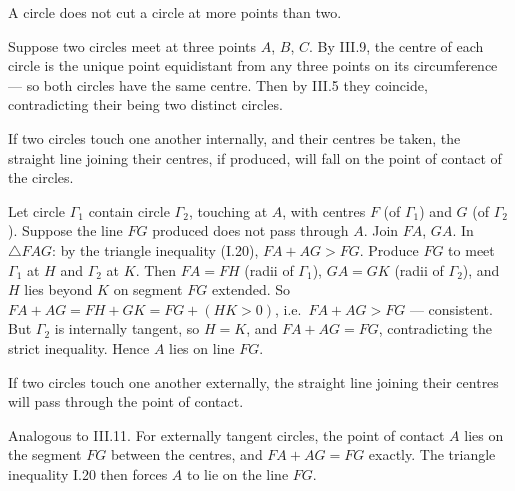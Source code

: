 \documentclass{rrxiv}
\begin{document}
\begin{claim}
\label{prop:III.10}
A circle does not cut a circle at more points than two.
\end{claim}
\begin{evidence}
\label{ev:III.10}
Suppose two circles meet at three points $A$, $B$, $C$.  By III.9,
the centre of each circle is the unique point equidistant from any
three points on its circumference --- so both circles have the same
centre.  Then by III.5 they coincide, contradicting their being two
distinct circles.
\end{evidence}

\begin{claim}
\label{prop:III.11}
If two circles touch one another internally, and their centres be
taken, the straight line joining their centres, if produced, will
fall on the point of contact of the circles.
\end{claim}
\begin{evidence}
\label{ev:III.11}
Let circle $\Gamma_1$ contain circle $\Gamma_2$, touching at $A$,
with centres $F$ (of $\Gamma_1$) and $G$ (of $\Gamma_2$).  Suppose
the line $FG$ produced does not pass through $A$.  Join $FA$, $GA$.
In $\triangle FAG$: by the triangle inequality (I.20), $FA + AG >
FG$.  Produce $FG$ to meet $\Gamma_1$ at $H$ and $\Gamma_2$ at $K$.
Then $FA = FH$ (radii of $\Gamma_1$), $GA = GK$ (radii of
$\Gamma_2$), and $H$ lies beyond $K$ on segment $FG$ extended.  So
$FA + AG = FH + GK = FG + (HK > 0)$, i.e.\ $FA + AG > FG$ ---
consistent.  But $\Gamma_2$ is internally tangent, so $H = K$, and
$FA + AG = FG$, contradicting the strict inequality.  Hence $A$
lies on line $FG$.
\end{evidence}

\begin{claim}
\label{prop:III.12}
If two circles touch one another externally, the straight line
joining their centres will pass through the point of contact.
\end{claim}
\begin{evidence}
\label{ev:III.12}
Analogous to III.11.  For externally tangent circles, the point of
contact $A$ lies on the segment $FG$ between the centres, and
$FA + AG = FG$ exactly.  The triangle inequality I.20 then forces
$A$ to lie on the line $FG$.
\end{evidence}
\end{document}
